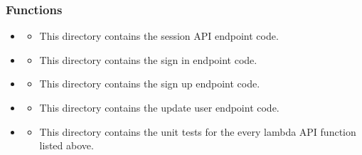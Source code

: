 \documentclass[12pt]{article}
\begin{document}
\subsubsection{Functions}
\begin{itemize}
    \item \href{https://github.com/AboutMyHT/angular-app/tree/main/aboutmyhometown-lambda-stack/session}{}
          \begin{itemize}
              \item This directory contains the session API endpoint code.
          \end{itemize}
    \item \href{https://github.com/AboutMyHT/angular-app/tree/main/aboutmyhometown-lambda-stack/signin}{}
          \begin{itemize}
              \item This directory contains the sign in endpoint code.
          \end{itemize}
    \item \href{https://github.com/AboutMyHT/angular-app/tree/main/aboutmyhometown-lambda-stack/signup}{}
          \begin{itemize}
              \item This directory contains the sign up endpoint code.
          \end{itemize}
    \item \href{https://github.com/AboutMyHT/angular-app/tree/main/aboutmyhometown-lambda-stack/updateuser}{}
          \begin{itemize}
              \item This directory contains the update user endpoint code.
          \end{itemize}
    \item \href{https://github.com/AboutMyHT/angular-app/tree/main/aboutmyhometown-lambda-stack/tests}{}
          \begin{itemize}
              \item This directory contains the unit tests for the every lambda API function listed above.
          \end{itemize}
\end{itemize}
\end{document}
